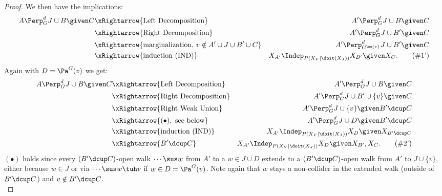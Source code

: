 \begin{Thm}
\begin{proof}
We then have the implications:
\begin{align*}
A  \Perp^d_G J \cup B \given C 
& \xRightarrow{\text{Left Decomposition}}  & A' \Perp^d_G J \cup B \given C \\
& \xRightarrow{\text{Right Decomposition}}  & A' \Perp^d_G J \cup B' \given C \\
 & \xRightarrow{\text{marginalization, } v \notin A'\cup J \cup B' \cup C}  & A' \Perp^d_{G^{\sm \{v\}}} J \cup B' \given C \\
 & \xRightarrow{\text{induction (IND)}}  & X_{A'} \Indep_{P(X_V|\doit(X_J))}  X_{B'} \given X_C. \label{eqn:bli'} \tag{\#1'}
\end{align*}
Again with $D = \Pa^G(v)$ we get:
\begin{align*}
A  \Perp^d_G J \cup B \given C  & \xRightarrow{\text{Left Decomposition}}  & A' \Perp^d_G J \cup B \given C \\
 & \xRightarrow{\text{Right Decomposition}}  & A' \Perp^d_G J \cup B' \cup \{v\} \given C \\
& \xRightarrow{\text{Right Weak Union}}  & A' \Perp^d_G J \cup \{v\} \given B' \dcup C  \\
 & \xRightarrow{(\bullet), \text{ see below}}  & A'  \Perp^d_G J \cup D \given B' \dcup C \\  
& \xRightarrow{\text{induction (IND)}}  &   X_{A'}  \Indep_{P(X_V|\doit(X_J))}  X_D \given X_{B' \dcup C}\\
& \xRightarrow{ B' \dcup C}  &   X_{A'}  \Indep_{P(X_V|\doit(X_J))}  X_D \given X_{B'}, X_C. \label{eqn:bla'} \tag{\#2'} 
\end{align*}
$(\bullet)$ holds since every $(B' \dcup C)$-open walk $\cdots \sus w$ from $A'$ to a $w \in J \cup D$ extends to 
a $(B' \dcup C)$-open walk from $A'$ to $J \cup \{v\}$, either because $w \in J$ or via $\cdots \sus w \tuh v$ if 
$w \in D=\Pa^G(v)$.
Note again that $w$ stays a non-collider in the extended walk (outside of $B'\dcup C$) and $v \notin B'\dcup C$.\\


\end{proof}
\end{Thm}
